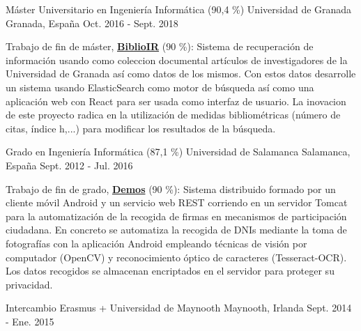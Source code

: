 


\begin{cventries}


\cventry
{Máster Universitario en Ingeniería Informática (90,4 \%)} %
{Universidad de Granada} %
{Granada, España} %
{Oct. 2016 - Sept. 2018} %
{
\begin{cvitems}
	\item {Trabajo de fin de máster, \href{https://github.com/AythaE/TFM}{\textbf{BiblioIR}} (90 \%): Sistema de recuperación de información usando como coleccion documental artículos de investigadores de la Universidad de Granada así como datos de los mismos. Con estos datos desarrolle un sistema usando ElasticSearch como motor de búsqueda así como una aplicación web con React para ser usada como interfaz de usuario. La inovacion de este proyecto radica en la utilización de medidas bibliométricas (número de citas, índice h,...) para modificar los resultados de la búsqueda. }
\end{cvitems}
 }

\cventry
{Grado en Ingeniería Informática (87,1 \%)} %
{Universidad de Salamanca} %
{Salamanca, España} %
{Sept. 2012 - Jul. 2016} %
{ %
\begin{cvitems}
	\item {Trabajo de fin de grado, \href{https://github.com/AythaE/Demos_Rest}{\textbf{Demos}} (90 \%): Sistema distribuido formado por un cliente móvil Android y un servicio web REST corriendo en un servidor Tomcat para la automatización de la recogida de firmas en mecanismos de participación ciudadana. En concreto se automatiza la recogida de DNIs mediante la toma de fotografías con la aplicación Android empleando técnicas de visión por computador (OpenCV) y reconocimiento óptico de caracteres (Tesseract-OCR). Los datos recogidos se almacenan encriptados en el servidor para proteger su privacidad. \\}
\end{cvitems}
}	

\cventry
{Intercambio Erasmus +} %
{Universidad de Maynooth} %
{Maynooth, Irlanda} %
{Sept. 2014 - Ene. 2015} %
{ }
\end{cventries}